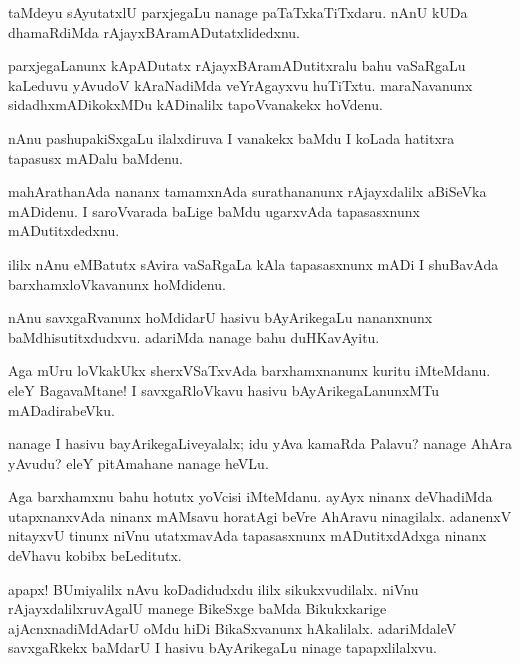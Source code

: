 \begin{mng}
taMdeyu sAyutatxlU parxjegaLu nanage paTaTxkaTiTxdaru. nAnU kUDa dhamaRdiMda rAjayxBAramADutatxlidedxnu.
\end{mng}

\begin{mng}
parxjegaLanunx kApADutatx rAjayxBAramADutitxralu bahu vaSaRgaLu kaLeduvu yAvudoV kAraNadiMda veYrAgayxvu huTiTxtu. maraNavanunx sidadhxmADikokxMDu kADinalilx tapoVvanakekx hoVdenu.
\end{mng}

\begin{mng}
nAnu pashupakiSxgaLu ilalxdiruva I vanakekx baMdu I koLada hatitxra tapasusx mADalu baMdenu.
\end{mng}

\begin{mng}
mahArathanAda nananx tamamxnAda surathananunx rAjayxdalilx aBiSeVka mADidenu. I saroVvarada baLige baMdu ugarxvAda tapasasxnunx mADutitxdedxnu. 
\end{mng}

\begin{mng}
ililx nAnu eMBatutx sAvira vaSaRgaLa kAla tapasasxnunx mADi I shuBavAda barxhamxloVkavanunx hoMdidenu.
\end{mng}

\begin{mng}
nAnu savxgaRvanunx hoMdidarU hasivu bAyArikegaLu nananxnunx baMdhisutitxdudxvu. adariMda nanage bahu duHKavAyitu.
\end{mng}

\begin{mng}
Aga mUru loVkakUkx sherxVSaTxvAda barxhamxnanunx kuritu iMteMdanu. eleY BagavaMtane! I savxgaRloVkavu hasivu bAyArikegaLanunxMTu mADadirabeVku.
\end{mng}

\begin{mng}
nanage I hasivu bayArikegaLiveyalalx; idu yAva kamaRda Palavu? nanage AhAra yAvudu? eleY pitAmahane nanage heVLu.
\end{mng}

\begin{mng}
Aga barxhamxnu bahu hotutx yoVcisi iMteMdanu. ayAyx ninanx deVhadiMda utapxnanxvAda ninanx mAMsavu horatAgi beVre AhAravu ninagilalx. adanenxV nitayxvU tinunx niVnu utatxmavAda tapasasxnunx mADutitxdAdxga ninanx deVhavu kobibx beLeditutx.
\end{mng}

\begin{mng}
apapx! BUmiyalilx nAvu koDadidudxdu ililx sikukxvudilalx. niVnu rAjayxdalilxruvAgalU manege BikeSxge baMda Bikukxkarige ajAcnxnadiMdAdarU oMdu hiDi BikaSxvanunx hAkalilalx. adariMdaleV savxgaRkekx baMdarU I hasivu bAyArikegaLu ninage tapapxlilalxvu.
\end{mng}

